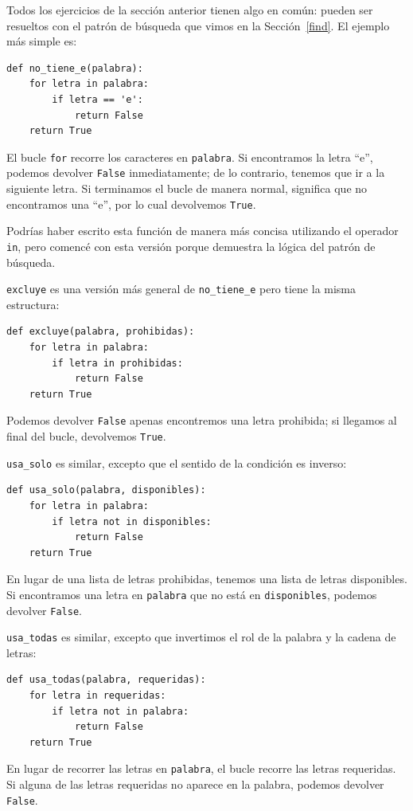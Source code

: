 \documentclass[10pt]{book}
\begin{document}
Todos los ejercicios de la sección anterior tienen algo en
común: pueden ser resueltos con el patrón de búsqueda que vimos
en la Sección~\ref{find}.  El ejemplo más simple es:

\begin{verbatim}
def no_tiene_e(palabra):
    for letra in palabra:
        if letra == 'e':
            return False
    return True
\end{verbatim}
%
El bucle {\tt for} recorre los caracteres en {\tt palabra}.  Si encontramos
la letra ``e'', podemos devolver {\tt False} inmediatamente; de lo contrario,
tenemos que ir a la siguiente letra.  Si terminamos el bucle de manera normal,
significa que no encontramos una ``e'', por lo cual devolvemos {\tt True}.

Podrías haber escrito esta función de manera más concisa utilizando el operador {\tt in},
pero comencé con esta versión porque
demuestra la lógica del patrón de búsqueda.

{\tt excluye} es una versión más general de \verb"no_tiene_e" pero
tiene la misma estructura:

\begin{verbatim}
def excluye(palabra, prohibidas):
    for letra in palabra:
        if letra in prohibidas:
            return False
    return True
\end{verbatim}
%
Podemos devolver {\tt False} apenas encontremos una letra prohibida;
si llegamos al final del bucle, devolvemos {\tt True}.

\verb"usa_solo" es similar, excepto que el sentido de la condición
es inverso:

\begin{verbatim}
def usa_solo(palabra, disponibles):
    for letra in palabra:
        if letra not in disponibles:
            return False
    return True
\end{verbatim}
%
En lugar de una lista de letras prohibidas, tenemos una lista de letras
disponibles.  Si encontramos una letra en {\tt palabra} que no está en
{\tt disponibles}, podemos devolver {\tt False}.

\verb"usa_todas" es similar, excepto que invertimos el rol
de la palabra y la cadena de letras:

\begin{verbatim}
def usa_todas(palabra, requeridas):
    for letra in requeridas:
        if letra not in palabra:
            return False
    return True
\end{verbatim}
%
En lugar de recorrer las letras en {\tt palabra}, el bucle
recorre las letras requeridas.  Si alguna de las letras requeridas
no aparece en la palabra, podemos devolver {\tt False}.
\end{document}
